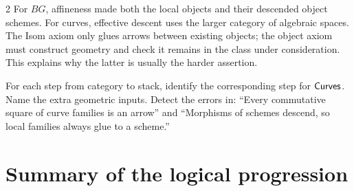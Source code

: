 \documentclass[12pt]{memoir}
\begin{document}
\begin{multicols}{2}
For $BG$, affineness made both the local objects and their descended
object schemes. For curves, effective descent uses the larger category
of algebraic spaces. The Isom axiom only glues arrows between existing
objects; the object axiom must construct geometry and check it remains
in the class under consideration. This explains why the latter is
usually the harder assertion.

\begin{Ej}\label{ex:curves}
For each step from category to stack, identify the corresponding step
for $\mathsf{Curves}$. Name the extra geometric inputs. Detect the errors in:
``Every commutative square of curve families is an arrow'' and
``Morphisms of schemes descend, so local families always glue to a
scheme.''
\end{Ej}

\section{Summary of the logical progression}\label{sec:summary}


\end{multicols}
\end{document}
